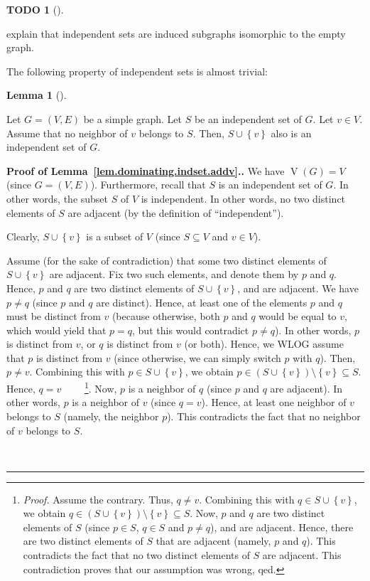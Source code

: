 \documentclass[numbers=enddot,12pt,final,onecolumn,notitlepage]{scrartcl}%
\theoremstyle{definition}
\newtheorem{lem}[theo]{Lemma}
\newenvironment{lemma}[1][]
{\begin{lem}[#1]\begin{leftbar}}
{\end{leftbar}\end{lem}}
\newtheorem{quest}[theo]{TODO}
\newenvironment{todo}[1][]
{\begin{quest}[#1]\begin{leftbar}}
{\end{leftbar}\end{quest}}
\newenvironment{proof}[1][Proof]{\noindent\textbf{#1.} }{\ \rule{0.5em}{0.5em}}
\newcommand{\set}[1]{\left\{ #1 \right\}}
\newcommand{\tup}[1]{\left( #1 \right)}
\newcommand{\verts}[1]{\operatorname{V}\left( #1 \right)}
\begin{document}
\begin{todo}
explain that independent sets are induced subgraphs isomorphic
to the empty graph.
\end{todo}

The following property of independent sets is almost trivial:

\begin{lemma} \label{lem.dominating.indset.addv}
Let $G = \tup{V, E}$ be a simple graph. Let $S$ be an independent set
of $G$. Let $v \in V$. Assume that no neighbor of $v$ belongs to $S$.
Then, $S \cup \set{v}$ also is an independent set of $G$.
\end{lemma}

\begin{proof}[Proof of Lemma~\ref{lem.dominating.indset.addv}.]
We have $\verts{G} = V$ (since $G = \tup{V, E}$). Furthermore, recall
that $S$ is an independent set of $G$. In other words,
the subset $S$ of $V$ is independent. In other words, no two
distinct elements of $S$ are adjacent (by the definition of
``independent'').

Clearly, $S \cup \set{v}$ is a subset of $V$ (since $S \subseteq V$
and $v \in V$).

Assume (for the sake of contradiction) that some two distinct elements
of $S \cup \set{v}$ are adjacent. Fix two such elements, and denote
them by $p$ and $q$. Hence, $p$ and $q$ are two distinct elements of
$S \cup \set{v}$, and are adjacent.
We have $p \neq q$ (since $p$ and $q$ are distinct). Hence,
at least one of the elements $p$ and $q$ must be distinct from $v$
(because otherwise, both $p$ and $q$ would be equal to $v$, which
would yield that $p = q$, but this would contradict $p \neq q$). In
other words, $p$ is distinct from $v$, or $q$ is distinct from $v$
(or both). Hence, we WLOG assume that $p$ is distinct from $v$ (since
otherwise, we can simply switch $p$ with $q$). Then, $p \neq v$.
Combining this with $p \in S \cup \set{v}$, we obtain
$p \in \tup{S \cup \set{v}} \setminus \set{v} \subseteq S$. Hence,
$q = v$ \ \ \ \ \footnote{\textit{Proof.} Assume the contrary. Thus,
$q \neq v$. Combining this with $q \in S \cup \set{v}$, we obtain
$q \in \tup{S \cup \set{v}} \setminus \set{v} \subseteq S$. Now, $p$
and $q$ are two distinct elements of $S$ (since $p \in S$, $q \in S$
and $p \neq q$), and are adjacent. Hence, there are two distinct
elements of $S$ that are adjacent (namely, $p$ and $q$). This
contradicts the fact that no two distinct elements of $S$ are
adjacent. This contradiction proves that our assumption was wrong,
qed.}. Now, $p$ is a neighbor of $q$ (since $p$ and $q$ are adjacent).
In other words, $p$ is a neighbor of $v$ (since $q = v$). Hence,
at least one neighbor of $v$ belongs to $S$ (namely, the neighbor
$p$). This contradicts the fact that no neighbor of $v$ belongs to
$S$.


\end{proof}
\end{document}

